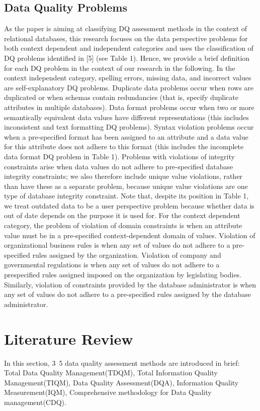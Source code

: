 \documentclass[pdftex,english,oribibl]{llncs}
\begin{document}
    \subsection{Data Quality Problems}
    As the paper is aiming at classifying DQ assessment methods in the context of relational databases, this
    research focuses on the data perspective problems for both context dependent and independent categories and uses the classification of DQ problems identified in [5] (see Table 1).
    Hence, we provide a brief definition for each DQ problem in the context of our research in the following.
    In the context independent category, spelling errors, missing data, and incorrect values are self-explanatory DQ problems.
    Duplicate data problems occur when rows are duplicated or when schemas contain redundancies (that is, specify duplicate attributes in multiple databases).
    Data format problems occur when two or more semantically equivalent data values have different representations (this includes inconsistent and text formatting DQ problems).
    Syntax violation problems occur when a pre-specified format has been assigned to an attribute and a data value for this attribute does not adhere to this format (this includes the incomplete data format DQ problem in Table 1).
    Problems with violations of integrity constraints arise when data values do not adhere to pre-specified database integrity constraints; we also therefore include unique value violations, rather than have these as a separate problem, because unique value violations are one type of database integrity constraint.
    Note that, despite its position in Table 1, we treat outdated data to be a user perspective problem because whether data is out of date depends on the purpose it is used for.
    For the context dependent category, the problem of violation of domain constraints is when an attribute value must be in a pre-specified context-dependent domain of values.
    Violation of organizational business rules is when any set of values do not adhere to a pre-specified rules assigned by the organization.
    Violation of company and governmental regulations is when any set of values do not adhere to a prespecified rules assigned imposed on the organization by legislating bodies.
    Similarly, violation of constraints provided by the database administrator is when any set of values do not adhere to a pre-specified rules assigned by the database administrator.



    \section{Literature Review}
    In this section, 3~5 data quality assessment methods are introduced in brief:
    Total Data Quality Management(TDQM),
    Total Information Quality Management(TIQM),
    Data Quality Assessment(DQA),
    Information Quality Measurement(IQM),
    Comprehensive methodology for Data Quality management(CDQ).
\end{document}
